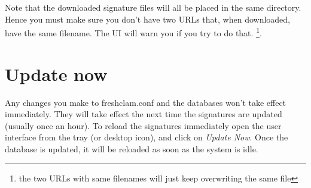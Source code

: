 Note that the downloaded signature files will all be placed in the same directory. Hence you must make sure you don't have two URLs that, when downloaded, have the same filename.
The UI will warn you if you try to do that. \footnote{the two URLs with same filenames will just keep overwriting the same file}.
\section{Update now}
\label{sec:updatenow}
Any changes you make to \gls{freshclam.conf} and the databases won't take effect immediately.
They will take effect the next time the signatures are updated (usually once an hour).
To reload the signatures immediately open the \CW user interface from the tray (or desktop icon), and click on \emph{Update Now}. 
Once the database is updated, it will be reloaded as soon as the system is idle.